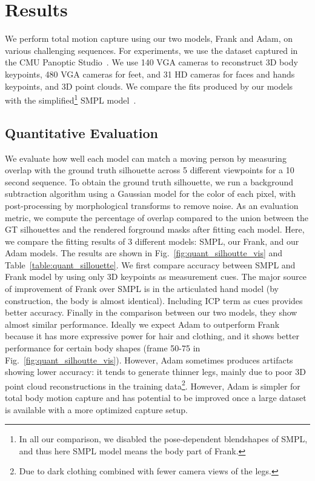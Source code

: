 \section{Results}
We perform total motion capture using our two models, Frank and Adam, on various challenging sequences. For experiments, we use the dataset captured in the CMU Panoptic Studio~\cite{Joo-15, joo2017panoptic}. We use 140 VGA cameras to reconstruct 3D body keypoints, 480 VGA cameras for feet, and 31 HD cameras for faces and hands keypoints, and 3D point clouds. We compare the fits produced by our models with the simplified\footnote{In all our comparison, we disabled the pose-dependent blendshapes of SMPL, and thus here SMPL model means the body part of Frank.} SMPL model~\cite{Loper2015}. %

\subsection{Quantitative Evaluation}
We evaluate how well each model can match a moving person by measuring overlap with the ground truth silhouette across 5 different viewpoints for a 10 second sequence. To obtain the ground truth silhouette, we run a background subtraction algorithm using a Gaussian model for the color of each pixel, with post-processing by morphological transforms to remove noise. As an evaluation metric, we compute the percentage of overlap compared to the union between the GT silhouettes and the rendered forground masks after fitting each model. Here, we compare the fitting results of 3 different models: SMPL, our Frank, and our Adam models. The results are shown in Fig.~\ref{fig:quant_silhoutte_vis} and Table~\ref{table:quant_sillouette}. We first compare accuracy between SMPL and Frank model by using only 3D keypoints as measurement cues. The major source of improvement of Frank over SMPL is in the articulated hand model (by construction, the body is almost identical). Including ICP term as cues provides better accuracy. Finally in the comparison between our two models, they show almost similar performance. Ideally we expect Adam to outperform Frank because it has more expressive power for hair and clothing, and it shows better performance for certain body shapes (frame 50-75 in Fig.~\ref{fig:quant_silhoutte_vis}). However, Adam sometimes produces artifacts showing lower accuracy: it tends to generate thinner legs, mainly due to poor 3D point cloud reconstructions in the training data\footnote{Due to dark clothing combined with fewer camera views of the legs.}. However, Adam is simpler for total body motion capture and has potential to be improved once a large dataset is available with a more optimized capture setup.

